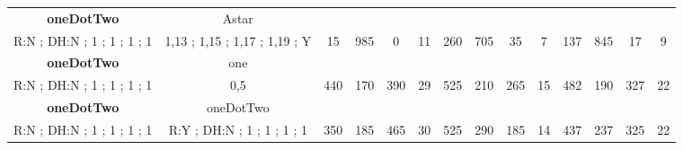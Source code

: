 \begin{table}[]
{\begin{tabular}{|c|c|c|c|c|c|c|c|c|c|c|c|c|c|}
\cellcolor{blue!15}\textbf{oneDotTwo} & Astar& {\color[HTML]{00009B} } & {\color[HTML]{9A0000} } & {\color[HTML]{009901} } &  & {\color[HTML]{00009B} } & {\color[HTML]{9A0000} } & {\color[HTML]{009901} } &  & {\color[HTML]{00009B} } & {\color[HTML]{9A0000} } & {\color[HTML]{009901} } &  \\ 
\cellcolor{ blue!15}R:N ; DH:N ; 1 ; 1 ; 1 ; 1 & 1,13 ; 1,15 ; 1,17 ; 1,19 ; Y & \multirow{-2}{*}{{\color[HTML]{00009B} 15}} & \multirow{-2}{*}{{\color[HTML]{9A0000} 985}} & \multirow{-2}{*}{{\color[HTML]{009901} 0}} & \multirow{-2}{*}{11} & \multirow{-2}{*}{{\color[HTML]{00009B} 260}} & \multirow{-2}{*}{{\color[HTML]{9A0000} 705}} & \multirow{-2}{*}{{\color[HTML]{009901} 35}} & \multirow{-2}{*}{7} & \multirow{-2}{*}{{\color[HTML]{00009B} 137}} & \multirow{-2}{*}{{\color[HTML]{9A0000} 845}} & \multirow{-2}{*}{{\color[HTML]{009901} 17}} & \multirow{-2}{*}{9} \\ \hline

\cellcolor{blue!15}\textbf{oneDotTwo} & one& {\color[HTML]{00009B} } & {\color[HTML]{9A0000} } & {\color[HTML]{009901} } &  & {\color[HTML]{00009B} } & {\color[HTML]{9A0000} } & {\color[HTML]{009901} } &  & {\color[HTML]{00009B} } & {\color[HTML]{9A0000} } & {\color[HTML]{009901} } &  \\ 
\cellcolor{ blue!15}R:N ; DH:N ; 1 ; 1 ; 1 ; 1 & 0,5 & \multirow{-2}{*}{{\color[HTML]{00009B} 440}} & \multirow{-2}{*}{{\color[HTML]{9A0000} 170}} & \multirow{-2}{*}{{\color[HTML]{009901} 390}} & \multirow{-2}{*}{29} & \multirow{-2}{*}{{\color[HTML]{00009B} 525}} & \multirow{-2}{*}{{\color[HTML]{9A0000} 210}} & \multirow{-2}{*}{{\color[HTML]{009901} 265}} & \multirow{-2}{*}{15} & \multirow{-2}{*}{{\color[HTML]{00009B} 482}} & \multirow{-2}{*}{{\color[HTML]{9A0000} 190}} & \multirow{-2}{*}{{\color[HTML]{009901} 327}} & \multirow{-2}{*}{22} \\ \hline

\cellcolor{blue!15}\textbf{oneDotTwo} & oneDotTwo& {\color[HTML]{00009B} } & {\color[HTML]{9A0000} } & {\color[HTML]{009901} } &  & {\color[HTML]{00009B} } & {\color[HTML]{9A0000} } & {\color[HTML]{009901} } &  & {\color[HTML]{00009B} } & {\color[HTML]{9A0000} } & {\color[HTML]{009901} } &  \\ 
\cellcolor{ blue!15}R:N ; DH:N ; 1 ; 1 ; 1 ; 1 & R:Y ; DH:N ; 1 ; 1 ; 1 ; 1 & \multirow{-2}{*}{{\color[HTML]{00009B} 350}} & \multirow{-2}{*}{{\color[HTML]{9A0000} 185}} & \multirow{-2}{*}{{\color[HTML]{009901} 465}} & \multirow{-2}{*}{30} & \multirow{-2}{*}{{\color[HTML]{00009B} 525}} & \multirow{-2}{*}{{\color[HTML]{9A0000} 290}} & \multirow{-2}{*}{{\color[HTML]{009901} 185}} & \multirow{-2}{*}{14} & \multirow{-2}{*}{{\color[HTML]{00009B} 437}} & \multirow{-2}{*}{{\color[HTML]{9A0000} 237}} & \multirow{-2}{*}{{\color[HTML]{009901} 325}} & \multirow{-2}{*}{22} \\ \hline


\end{tabular}}
\end{table}
